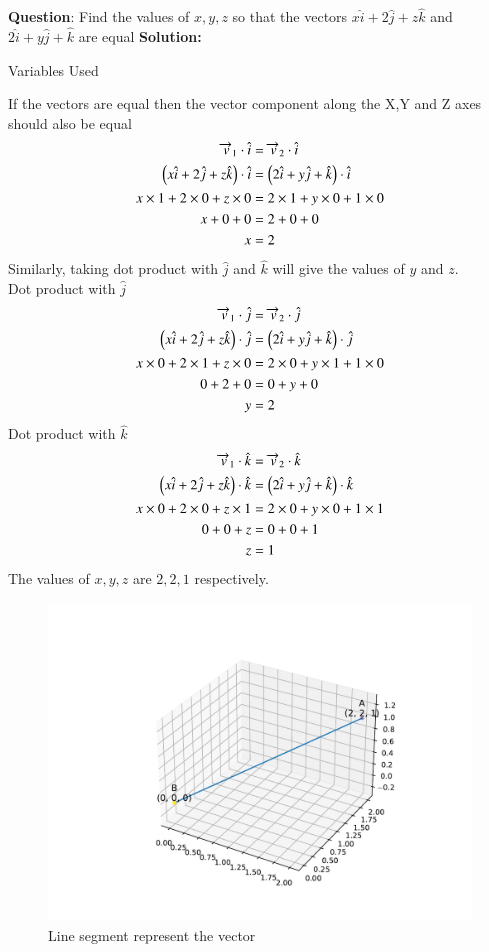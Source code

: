 \documentclass[journal]{IEEEtran}
\begin{document}
\textbf{Question}:\newline
Find the values of $x,y,z$ so that the vectors $x\hat{i}+2\hat{j}+z\hat{k}$ and $2\hat{i}+y\hat{j}+\hat{k}$ are equal
\newline
\textbf{Solution: }
\begin{table}[h!]    
  \centering
  
  \caption{Variables Used}
  \label{tab1.1.2.2}
\end{table}
\newline
If the vectors are equal then the vector component along the X,Y and Z axes should also be equal
\begin{align}
\overrightarrow{v}_1\cdot \hat{i} &= \overrightarrow{v}_2\cdot \hat{i}\\
\left(x\hat{i}+2\hat{j}+z\hat{k}\right) \cdot \hat{i} &= \left(2\hat{i}+y\hat{j}+\hat{k}\right) \cdot \hat{i}\\
x\times 1+2\times 0+ z\times 0&=2\times 1+y\times 0+ 1\times 0\\
x+0+0&=2+0+0\\
x&=2
\end{align}
Similarly, taking dot product with $\hat{j}$ and $\hat{k}$ will give the values of $y$ and $z$.\\
Dot product with $\hat{j}$
\begin{align}
\overrightarrow{v}_1\cdot \hat{j} &= \overrightarrow{v}_2\cdot \hat{j}\\
\left(x\hat{i}+2\hat{j}+z\hat{k}\right) \cdot \hat{j} &= \left(2\hat{i}+y\hat{j}+\hat{k}\right) \cdot \hat{j}\\
x\times 0+2\times 1+ z\times 0&=2\times 0+y\times 1+ 1\times 0\\
0+2+0&=0+y+0\\
y&=2
\end{align}
Dot product with $\hat{k}$
\begin{align}
\overrightarrow{v}_1\cdot \hat{k} &= \overrightarrow{v}_2\cdot \hat{k}\\
\left(x\hat{i}+2\hat{j}+z\hat{k}\right) \cdot \hat{k} &= \left(2\hat{i}+y\hat{j}+\hat{k}\right) \cdot \hat{k}\\
x\times 0+2\times 0+ z\times 1&=2\times 0+y\times 0+ 1\times 1\\
0+0+z&=0+0+1\\
z&=1
\end{align}
The values of $x,y,z$ are $2,2,1$ respectively.
\begin{figure}[h!]
   \centering
   \includegraphics[width=1\linewidth]{figs/fig.pdf}
   \caption{Line segment represent the vector}
   \label{stemplot}
\end{figure}
\end{document}
